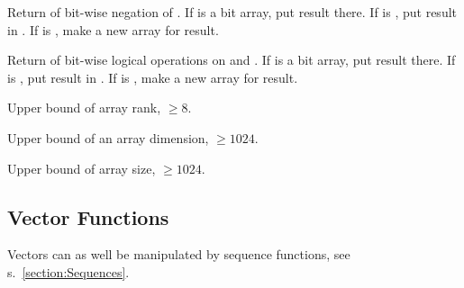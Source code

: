 \begin{LIST}{1cm}
  {
  Return  of bit-wise negation of . If
   is a bit array, put result there. If  is \T, put
  result in . If  is \NIL, make a new array for
  result. 
  }

  {
  Return  of bit-wise logical operations on
   and  . If  is a bit
  array, put result there. If  is \T, put result in
  . If  is \NIL, make a new array for
  result. 
  }

  {
  Upper bound of array rank, $\geq 8$.
  }

  {
  Upper bound of an array dimension, $\geq 1024$.
  }

  {
  Upper bound of array size, $\geq 1024$.
  }

\end{LIST}


\subsection{Vector Functions} 

Vectors can as well be manipulated by sequence functions, see
s.\ \ref{section:Sequences}. 

